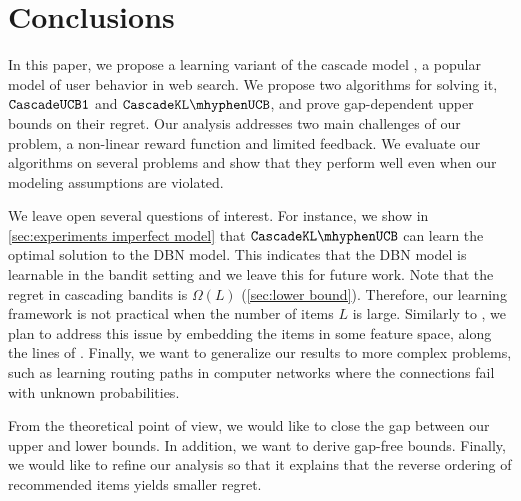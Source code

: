 
\section{Conclusions}
\label{sec:conclusions}

In this paper, we propose a learning variant of the cascade model \cite{craswell08experimental}, a popular model of user behavior in web search. We propose two algorithms for solving it, ${\tt CascadeUCB1}$ and $\cascadeklucb$, and prove gap-dependent upper bounds on their regret. Our analysis addresses two main challenges of our problem, a non-linear reward function and limited feedback. We evaluate our algorithms on several problems and show that they perform well even when our modeling assumptions are violated.

We leave open several questions of interest. For instance, we show in \cref{sec:experiments imperfect model} that  $\cascadeklucb$ can learn the optimal solution to the DBN model. This indicates that the DBN model is learnable in the bandit setting and we leave this for future work. Note that the regret in cascading bandits is $\Omega(L)$ (\cref{sec:lower bound}). Therefore, our learning framework is not practical when the number of items $L$ is large. Similarly to \citet{slivkins13ranked}, we plan to address this issue by embedding the items in some feature space, along the lines of  \citet{wen15efficient}. Finally, we want to generalize our results to more complex problems, such as learning routing paths in computer networks where the connections fail with unknown probabilities.

From the theoretical point of view, we would like to close the gap between our upper and lower bounds. In addition, we want to derive gap-free bounds. Finally, we would like to refine our analysis so that it explains that the reverse ordering of recommended items yields smaller regret.
